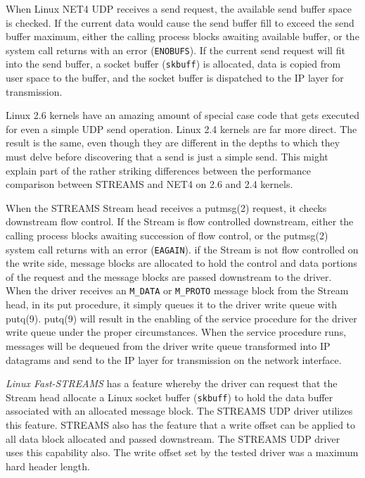 \documentclass[letterpaper,final,notitlepage,twocolumn,10pt,twoside]{article}
\begin{document}
When Linux NET4 UDP receives a send request, the available send buffer space
is checked.  If the current data would cause the send buffer fill to exceed
the send buffer maximum, either the calling process blocks awaiting available
buffer, or the system call returns with an error (\texttt{ENOBUFS}).  If the
current send request will fit into the send buffer, a socket buffer
(\texttt{skbuff}) is allocated, data is copied from user space to the buffer,
and the socket buffer is dispatched to the IP layer for transmission.

Linux 2.6 kernels have an amazing amount of special case code that gets
executed for even a simple UDP send operation.  Linux 2.4 kernels are far more
direct.  The result is the same, even though they are different in the depths
to which they must delve before discovering that a send is just a simple send.
This might explain part of the rather striking differences between the
performance comparison between STREAMS and NET4 on 2.6 and 2.4 kernels.

When the STREAMS Stream head receives a putmsg(2) request, it checks
downstream flow control.  If the Stream is flow controlled downstream, either
the calling process blocks awaiting succession of flow control, or the
putmsg(2) system call returns with an error (\texttt{EAGAIN}).  if the Stream
is not flow controlled on the write side, message blocks are allocated to hold
the control and data portions of the request and the message blocks are passed
downstream to the driver.  When the driver receives an \texttt{M\_DATA} or
\texttt{M\_PROTO} message block from the Stream head, in its put procedure, it
simply queues it to the driver write queue with putq(9).  putq(9) will result
in the enabling of the service procedure for the driver write queue under the
proper circumstances.  When the service procedure runs, messages will be
dequeued from the driver write queue transformed into IP datagrams and send to
the IP layer for transmission on the network interface.

\textsl{Linux Fast-STREAMS} has a feature whereby the driver can request that
the Stream head allocate a Linux socket buffer (\texttt{skbuff}) to hold the
data buffer associated with an allocated message block.  The STREAMS UDP
driver utilizes this feature.  STREAMS also has the feature that a write
offset can be applied to all data block allocated and passed downstream.  The
STREAMS UDP driver uses this capability also.  The write offset set by the
tested driver was a maximum hard header length.
\end{document}
